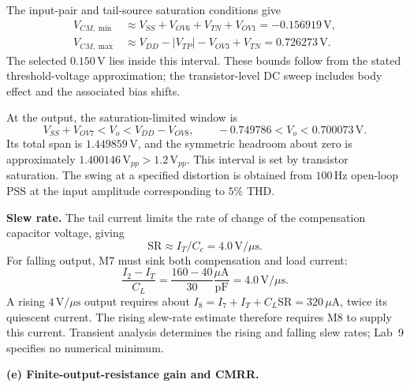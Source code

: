 \documentclass[12pt,letterpaper]{article}
\newcommand{\uA}{\,\mu\mathrm{A}}
\newcommand{\V}{\,\mathrm{V}}
\newcommand{\Vus}{\,\mathrm{V}/\mu\mathrm{s}}
\begin{document}
\begin{enumerate}
The input-pair and tail-source saturation conditions give
\begin{align*}
V_{CM,\min}&\approx V_{SS}+V_{OV6}+V_{TN}+V_{OV1}
=-0.156919\V,\\
V_{CM,\max}&\approx V_{DD}-|V_{TP}|-V_{OV3}+V_{TN}
=0.726273\V.
\end{align*}
The selected $0.150\V$ lies inside this interval.
These bounds follow from the stated threshold-voltage approximation;
the transistor-level DC sweep includes body effect and the associated
bias shifts.

At the output, the saturation-limited window is
\[
V_{SS}+V_{OV7}<V_o<V_{DD}-V_{OV8},
\qquad -0.749786<V_o<0.700073\V.
\]
Its total span is $1.449859\V$, and the symmetric headroom about
zero is approximately $\boxed{1.400146\V_{pp}>1.2\V_{pp}}$.
This interval is set by transistor saturation. The swing at a
specified distortion is obtained from $100\,\mathrm{Hz}$ open-loop
PSS at the input amplitude corresponding to $5\%$ THD.

\textbf{Slew rate.}
The tail current limits the rate of change of the compensation
capacitor voltage, giving
\[
\mathrm{SR}\approx I_T/C_c=\boxed{4.0\Vus}.
\]
For falling output, M7 must sink both compensation and load current:
\[
\frac{I_2-I_T}{C_L}=
\frac{160-40}{30}\frac{\mu\mathrm{A}}{\mathrm{pF}}=4.0\Vus.
\]
A rising $4\Vus$ output requires about
$I_8=I_7+I_T+C_L\mathrm{SR}=320\uA$, twice its quiescent
current. The rising slew-rate estimate therefore requires M8 to
supply this current. Transient analysis determines the rising and
falling slew rates; Lab~9 specifies no numerical minimum.

\newpage
\textbf{(e) Finite-output-resistance gain and CMRR.}


\end{enumerate}
\end{document}
